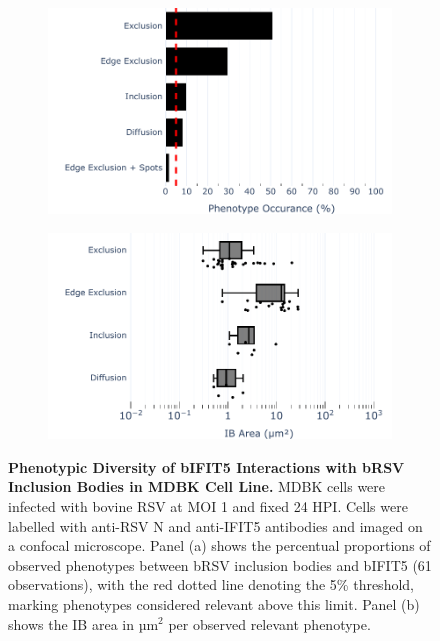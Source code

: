 \begin{figure}
    \begin{subfigure}{0.495\textwidth}
        \caption{}
        \includegraphics[width=1\linewidth]{08. Chapter 3/Figs/02. Infection/04. IFIT5/07. bar_i5_mdbk.pdf} 
    \end{subfigure}
    \begin{subfigure}{0.495\textwidth}
        \caption{}
        \includegraphics[width=1\linewidth]{08. Chapter 3/Figs/02. Infection/04. IFIT5/08. box_i5_mdbk.pdf}
    \end{subfigure}
    \caption[Phenotypic Diversity of bIFIT5 Interactions with bRSV Inclusion Bodies in MDBK Cell Line.]{\textbf{Phenotypic Diversity of bIFIT5 Interactions with bRSV Inclusion Bodies in MDBK Cell Line.} MDBK cells were infected with bovine RSV at MOI 1 and fixed 24 HPI. Cells were labelled with anti-RSV N and anti-IFIT5 antibodies and imaged on a confocal microscope. Panel (a) shows the percentual proportions of observed phenotypes between bRSV inclusion bodies and bIFIT5 (61 observations), with the red dotted line denoting the 5\% threshold, marking phenotypes considered relevant above this limit. Panel (b) shows the IB area in \(\mbox{µm}^2\) per observed relevant phenotype.}
    \label{fig:Phenotypic Diversity of bIFIT5 Interactions with bRSV Inclusion Bodies in MDBK Cell Line}
\end{figure}

